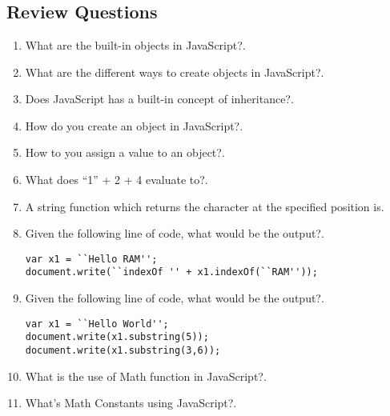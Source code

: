 \documentclass[11pt,a4paper]{article}
\begin{document}
\section*{}
\subsection*{Review Questions}
\begin{enumerate}\itemsep10pt
\item What are the built-in objects in JavaScript?\underline{\hspace{3cm}}.
\item What are the different ways to create objects in JavaScript?\underline{\hspace{3cm}}.
\item Does JavaScript has a built-in concept of inheritance?\underline{\hspace{3cm}}.
\item How do you create an object in JavaScript?\underline{\hspace{3cm}}.
\item How to you assign a value to an object?\underline{\hspace{3cm}}.
\item  What does ``1'' + 2 + 4 evaluate to?\underline{\hspace{3cm}}.
\item A string function which returns the character at the specified position is\underline{\hspace{3cm}}.
\item Given the following line of code, what would be the output?\underline{\hspace{3cm}}.
\begin{lstlisting}
var x1 = ``Hello RAM'';
document.write(``indexOf '' + x1.indexOf(``RAM''));
\end{lstlisting} 
\item Given the following line of code, what would be the output?\underline{\hspace{3cm}}.
\begin{lstlisting}
var x1 = ``Hello World''; 
document.write(x1.substring(5)); 
document.write(x1.substring(3,6));
\end{lstlisting}
\item What is the use of Math function in JavaScript?\underline{\hspace{3cm}}.
\item What's Math Constants using JavaScript?\underline{\hspace{3cm}}.

\end{enumerate}
\end{document}
